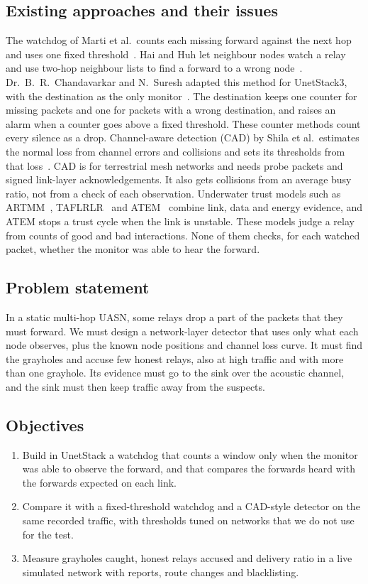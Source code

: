 \documentclass[11pt]{article}
\begin{document}
\subsection{Existing approaches and their issues}\label{sec:existing}
\noindent
The watchdog of Marti et al.\ counts each missing forward against the next hop and uses one fixed threshold~\cite{marti2000}.
Hai and Huh let neighbour nodes watch a relay and use two-hop neighbour lists to find a forward to a wrong node~\cite{hai2008}.
Dr.~B.~R.~Chandavarkar and N.~Suresh adapted this method for UnetStack3, with the destination as the only monitor~\cite{brc2021}.
The destination keeps one counter for missing packets and one for packets with a wrong destination, and raises an alarm when a counter goes above a fixed threshold.
These counter methods count every silence as a drop.
Channel-aware detection (CAD) by Shila et al.\ estimates the normal loss from channel errors and collisions and sets its thresholds from that loss~\cite{shila2010}.
CAD is for terrestrial mesh networks and needs probe packets and signed link-layer acknowledgements.
It also gets collisions from an average busy ratio, not from a check of each observation.
Underwater trust models such as ARTMM~\cite{han2015}, TAFLRLR~\cite{han2023} and ATEM~\cite{liu2024} combine link, data and energy evidence, and ATEM stops a trust cycle when the link is unstable.
These models judge a relay from counts of good and bad interactions.
None of them checks, for each watched packet, whether the monitor was able to hear the forward.

\subsection{Problem statement}\label{sec:problem}
\noindent
In a static multi-hop UASN, some relays drop a part of the packets that they must forward.
We must design a network-layer detector that uses only what each node observes, plus the known node positions and channel loss curve.
It must find the grayholes and accuse few honest relays, also at high traffic and with more than one grayhole.
Its evidence must go to the sink over the acoustic channel, and the sink must then keep traffic away from the suspects.

\subsection{Objectives}\label{sec:objectives}
\begin{enumerate}\setlength{\itemsep}{0pt}
  \item Build in UnetStack a watchdog that counts a window only when the monitor was able to observe the forward, and that compares the forwards heard with the forwards expected on each link.
  \item Compare it with a fixed-threshold watchdog and a CAD-style detector on the same recorded traffic, with thresholds tuned on networks that we do not use for the test.
  \item Measure grayholes caught, honest relays accused and delivery ratio in a live simulated network with reports, route changes and blacklisting.
\end{enumerate}
\end{document}
